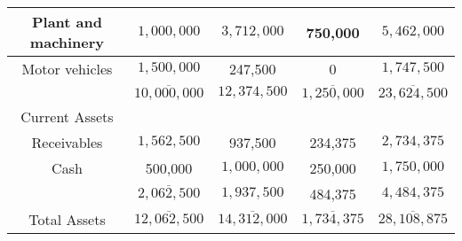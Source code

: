 \begin{tabular}{|c|c|c|c|c|}
\hline Plant and machinery & $1,000,000$ & $3,712,000$ & 750,000 & $5,462,000$ \\
\hline Motor vehicles & $1,500,000$ & 247,500 & 0 & $1,747,500$ \\
\hline & $\overline{10,000,000}$ & $12,374,500$ & $\overline{1,250,000}$ & $\overline{23,624,500}$ \\
\hline Current Assets & & & & \\
\hline Receivables & $1,562,500$ & 937,500 & 234,375 & $2,734,375$ \\
\hline Cash & 500,000 & $1,000,000$ & 250,000 & $1,750,000$ \\
\hline & $\overline{2,062,500}$ & $1,937,500$ & 484,375 & $4,484,375$ \\
\hline Total Assets & $\overline{12,062,500}$ & $\overline{14,312,000}$ & $\overline{1,734,375}$ & $\overline{28,108,875}$ \\
\hline
\end{tabular}
